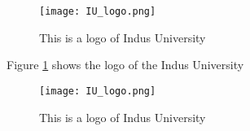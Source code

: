 \documentclass{article}
\begin{document}
\begin{figure}
    \centering
    \texttt{[image: IU\_logo.png]}
    \caption{This is a logo of Indus University}
    \label{fig:1}
\end{figure}
Figure \ref{fig:1} shows the logo of the Indus University
\begin{figure}
    \centering
    \texttt{[image: IU\_logo.png]}
    \caption{This is a logo of Indus University}
    \label{fig:2}
\end{figure}
\end{document}
